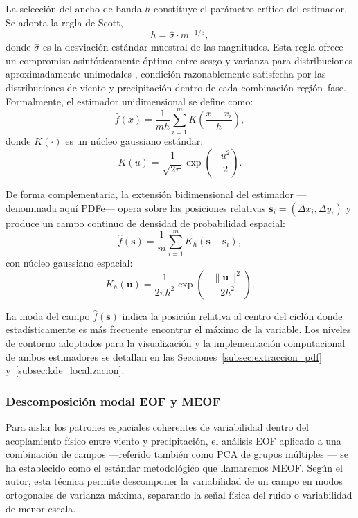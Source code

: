 La selección del ancho de banda $h$ constituye el parámetro crítico del estimador. Se adopta la regla 
de Scott,
\begin{equation}\label{eq:scott_rule}
h = \hat{\sigma} \cdot m^{-1/5},
\end{equation}
donde $\hat{\sigma}$ es la desviación estándar muestral de las magnitudes. 
Esta regla ofrece un compromiso asintóticamente óptimo entre sesgo y varianza para distribuciones aproximadamente unimodales \citep{weglarczyk2018kernel}, condición razonablemente satisfecha por las distribuciones de viento y precipitación dentro de cada combinación región--fase. 
Formalmente, el estimador unidimensional se define como:
\begin{equation}\label{eq:tb_kde_pdf}
\hat{f}(x) = \frac{1}{m h} \sum_{i=1}^{m} K\!\left(\frac{x - x_i}{h}\right),
\end{equation}
donde $K(\cdot)$ es un núcleo gaussiano estándar:
\begin{equation}\label{eq:tb_gaussian_kernel}
K(u) = \frac{1}{\sqrt{2\pi}} \exp\!\left(-\frac{u^2}{2}\right).
\end{equation}

De forma complementaria, la extensión bidimensional del estimador —denominada aquí PDFe— opera sobre las posiciones relativas $\mathbf{s}_i = (\Delta x_i, \Delta y_i)$ y produce un campo continuo de densidad de probabilidad espacial:
\begin{equation}\label{eq:tb_kde_simple}
\hat{f}(\mathbf{s}) = \frac{1}{m} \sum_{i=1}^{m} K_h(\mathbf{s} - \mathbf{s}_i),
\end{equation}
con núcleo gaussiano espacial:
\begin{equation}\label{eq:tb_gauss_kernel_2d_simple}
K_h(\mathbf{u}) = \frac{1}{2\pi h^2} \exp\!\left(-\frac{\|\mathbf{u}\|^2}{2h^2}\right).
\end{equation}

La moda del campo $\hat{f}(\mathbf{s})$ indica la posición relativa al centro del ciclón donde 
estadísticamente es más frecuente encontrar el máximo de la variable. 
Los niveles de contorno adoptados para la visualización y la implementación computacional de ambos estimadores se detallan en las Secciones~\ref{subsec:extraccion_pdf} y~\ref{subsec:kde_localizacion}.

\subsubsection{Descomposición modal EOF y MEOF}\label{subsubsec:tb_eof}
Para aislar los patrones espaciales coherentes de variabilidad dentro del acoplamiento físico entre viento y precipitación, el análisis EOF aplicado a una combinación de campos —referido también como PCA de grupos múltiples \citep{hannachi2007empirical}— se ha establecido como el estándar metodológico que llamaremos MEOF. 
Según el autor, esta técnica permite descomponer la variabilidad de un campo en modos ortogonales de varianza máxima, separando la señal física del ruido o variabilidad de menor escala.

